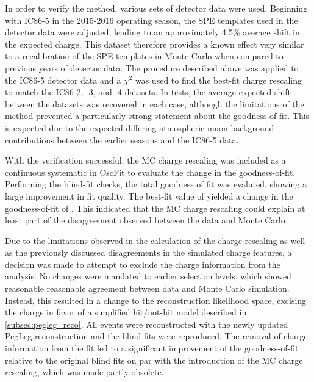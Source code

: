 In order to verify the method, various sets of detector data were used.
Beginning with IC86-5 in the 2015-2016 operating season, the SPE templates used in the detector data were adjusted, leading to an approximately 4.5\% average shift in the expected charge.
This dataset therefore provides a known effect very similar to a recalibration of the SPE templates in Monte Carlo when compared to previous years of detector data.
The procedure described above was applied to the IC86-5 detector data and a $\chi^2$ was used to find the best-fit charge rescaling to match the IC86-2, -3, and -4 datasets.
In tests, the average expected shift between the datasets was recovered in each case, although the limitations of the method prevented a particularly strong statement about the goodness-of-fit.
This is expected due to the expected differing atmospheric muon background contributions between the earlier seasons and the IC86-5 data.

With the verification successful, the MC charge rescaling was included as a continuous systematic in OscFit to evaluate the change in the goodness-of-fit.
Performing the blind-fit checks, the total goodness of fit was evaluted, showing a large improvement in fit quality.
The best-fit value of  yielded a change in the goodness-of-fit of .
This indicated that the MC charge rescaling could explain at least part of the disagreement observed between the data and Monte Carlo.

Due to the limitations observed in the calculation of the charge rescaling as well as the previously discussed disagreements in the simulated charge features, a decision was made to attempt to exclude the charge information from the analysis.
No changes were mandated to earlier selection levels, which showed reasonable reasonable agreement between data and Monte Carlo simulation.
Instead, this resulted in a change to the reconstruction likelihood space, excising the charge in favor of a simplified hit/not-hit model described in \ref{subsec:pegleg_reco}.
All events were reconstructed with the newly updated PegLeg reconstruction and the blind fits were reproduced.
The removal of charge information from the fit led to a significant improvement of the goodness-of-fit relative to the original blind fits on par with the introduction of the MC charge rescaling, which was made partly obsolete.

\label{subsubsec:flaring_doms}
